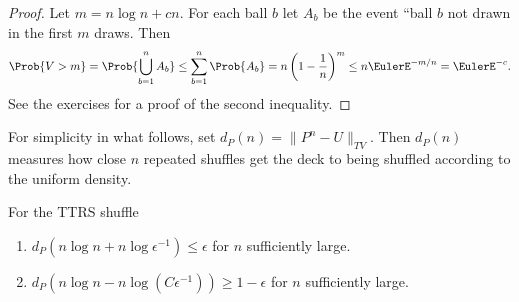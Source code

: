 \documentclass[12pt]{article}
\begin{document}
\begin{proof}
    Let \( m = n \log n + c n \).  For each ball \( b \) let \( A_b \)
    be the event ``ball \( b \) not drawn in the first \( m \) draws.
    Then
    \[
        \Prob{ V > m} = \Prob{ \bigcup_{b=1}^n A_b } \le \sum_{b=1}^n \Prob{A_b} =
        n \left( 1 - \frac{1}{n} \right)^m \le n \EulerE^{-m/n} = \EulerE^
        {-c}.
      \]
      See the exercises for a proof of the second inequality.
\end{proof}




For simplicity in what follows, set \( d_P(n) = \| P^n - U \|_{TV} \).
Then \( d_P(n) \) measures how close \( n \) repeated shuffles get the
deck to being shuffled according to the uniform density.

\begin{theorem}
    For the TTRS shuffle
    \begin{enumerate}
        \item
            \( d_P(n \log n + n \log \epsilon^{-1} )\le \epsilon \) for \(
            n \) sufficiently large.
        \item
            \( d_P(n \log n - n \log (C \epsilon^{-1})) \ge 1-\epsilon \)
            for \( n \) sufficiently large.
    \end{enumerate}
\end{theorem}
\end{document}
